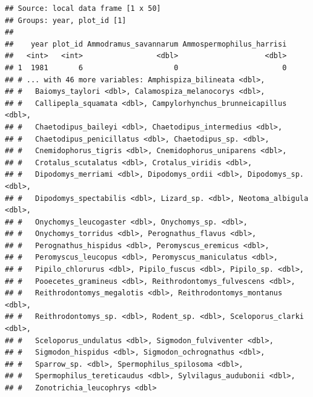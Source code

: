 \documentclass[]{article}
\newenvironment{Shaded}{\begin{snugshade}}{\end{snugshade}}
\newcommand{\KeywordTok}[1]{\textcolor[rgb]{0.13,0.29,0.53}{\textbf{{#1}}}}
\newcommand{\DataTypeTok}[1]{\textcolor[rgb]{0.13,0.29,0.53}{{#1}}}
\newcommand{\DecValTok}[1]{\textcolor[rgb]{0.00,0.00,0.81}{{#1}}}
\newcommand{\StringTok}[1]{\textcolor[rgb]{0.31,0.60,0.02}{{#1}}}
\newcommand{\OtherTok}[1]{\textcolor[rgb]{0.56,0.35,0.01}{{#1}}}
\newcommand{\NormalTok}[1]{{#1}}
\begin{document}
\begin{Shaded}
\end{Shaded}

\begin{verbatim}
## Source: local data frame [1 x 50]
## Groups: year, plot_id [1]
## 
##    year plot_id Ammodramus_savannarum Ammospermophilus_harrisi
##   <int>   <int>                 <dbl>                    <dbl>
## 1  1981       6                     0                        0
## # ... with 46 more variables: Amphispiza_bilineata <dbl>,
## #   Baiomys_taylori <dbl>, Calamospiza_melanocorys <dbl>,
## #   Callipepla_squamata <dbl>, Campylorhynchus_brunneicapillus <dbl>,
## #   Chaetodipus_baileyi <dbl>, Chaetodipus_intermedius <dbl>,
## #   Chaetodipus_penicillatus <dbl>, Chaetodipus_sp. <dbl>,
## #   Cnemidophorus_tigris <dbl>, Cnemidophorus_uniparens <dbl>,
## #   Crotalus_scutalatus <dbl>, Crotalus_viridis <dbl>,
## #   Dipodomys_merriami <dbl>, Dipodomys_ordii <dbl>, Dipodomys_sp. <dbl>,
## #   Dipodomys_spectabilis <dbl>, Lizard_sp. <dbl>, Neotoma_albigula <dbl>,
## #   Onychomys_leucogaster <dbl>, Onychomys_sp. <dbl>,
## #   Onychomys_torridus <dbl>, Perognathus_flavus <dbl>,
## #   Perognathus_hispidus <dbl>, Peromyscus_eremicus <dbl>,
## #   Peromyscus_leucopus <dbl>, Peromyscus_maniculatus <dbl>,
## #   Pipilo_chlorurus <dbl>, Pipilo_fuscus <dbl>, Pipilo_sp. <dbl>,
## #   Pooecetes_gramineus <dbl>, Reithrodontomys_fulvescens <dbl>,
## #   Reithrodontomys_megalotis <dbl>, Reithrodontomys_montanus <dbl>,
## #   Reithrodontomys_sp. <dbl>, Rodent_sp. <dbl>, Sceloporus_clarki <dbl>,
## #   Sceloporus_undulatus <dbl>, Sigmodon_fulviventer <dbl>,
## #   Sigmodon_hispidus <dbl>, Sigmodon_ochrognathus <dbl>,
## #   Sparrow_sp. <dbl>, Spermophilus_spilosoma <dbl>,
## #   Spermophilus_tereticaudus <dbl>, Sylvilagus_audubonii <dbl>,
## #   Zonotrichia_leucophrys <dbl>
\end{verbatim}
\end{document}
